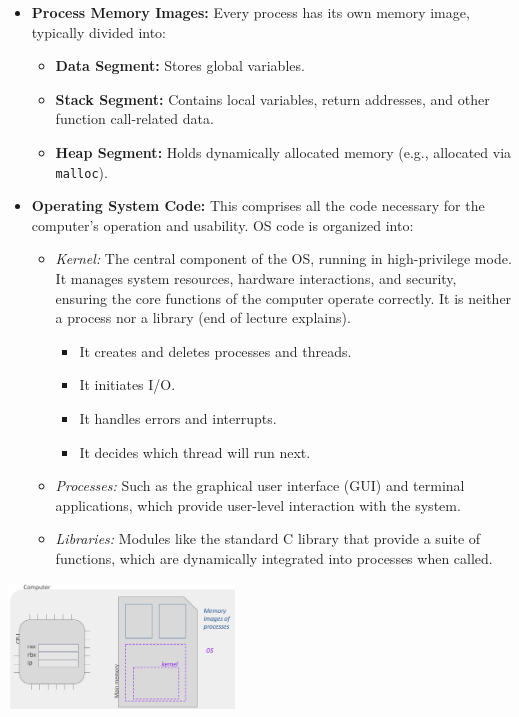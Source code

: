 \begin{itemize}
  \item \textbf{Process Memory Images:} Every process has its own memory image, typically divided into:
  \begin{itemize}
    \item \textbf{Data Segment:} Stores global variables.
    \item \textbf{Stack Segment:} Contains local variables, return addresses, and other function call-related data.
    \item \textbf{Heap Segment:} Holds dynamically allocated memory (e.g., allocated via \texttt{malloc}).
  \end{itemize}
  \vspace{5px} 
  \item \textbf{Operating System Code:} This comprises all the code necessary for the computer's operation and usability. OS code is organized into:
    \begin{itemize}
      \item \emph{Kernel:} The central component of the OS, running in high-privilege mode. It manages system resources, hardware interactions, and security, ensuring the core functions of the computer operate correctly. It is neither a process nor a library (end of lecture explains).
        \begin{itemize}
          \item It creates and deletes processes and threads.
          \item It initiates I/O.
          \item It handles errors and interrupts.
          \item It decides which thread will run next.
        \end{itemize}
      \item \emph{Processes:} Such as the graphical user interface (GUI) and terminal applications, which provide user-level interaction with the system.
      \item \emph{Libraries:} Modules like the standard C library that provide a suite of functions, which are dynamically integrated into processes when called.
    \end{itemize}
\end{itemize}

\begin{center}
  \includegraphics[width=0.45\textwidth]{chapters/L4/images/main-mem-content.png}
\end{center}
\newpage
